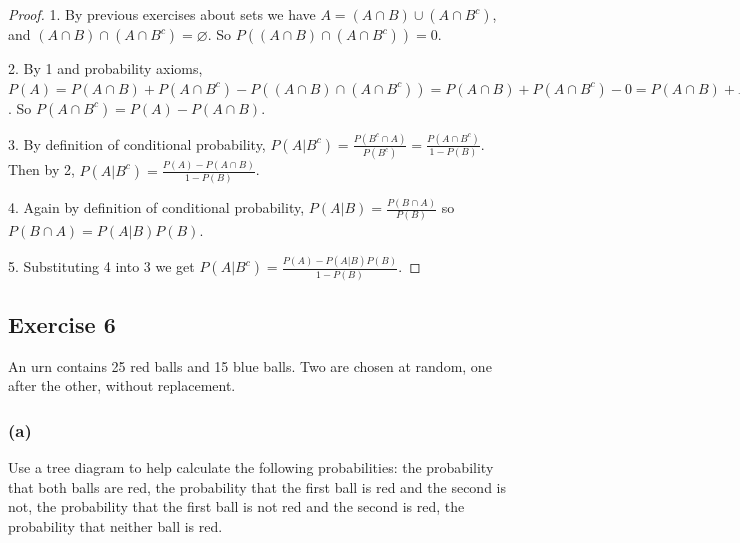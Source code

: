 \documentclass[14pt]{extarticle}
\newcommand{\es}{\varnothing}
\begin{document}
\begin{proof}
     1. By previous exercises about sets we have \(A = (A \cap B) \cup (A \cap B^c)\), and \((A \cap B) \cap (A \cap B^c) =
     \es\). So \(P((A \cap B) \cap (A \cap B^c)) = 0\).

     2. By 1 and probability axioms, \(P(A) = P(A \cap B) + P(A \cap B^c) - P((A \cap B) \cap (A \cap B^c)) = P(A \cap B) +
     P(A \cap B^c) - 0 = P(A \cap B) + P(A \cap B^c)\). So \(P(A \cap B^c) = P(A) - P(A \cap B)\).

     3. By definition of conditional probability, \(P(A | B^c) = \frac{P(B^c \cap A)}{P(B^c)} = \frac{P(A \cap B^c)}{1-P(B)}\).
     Then by 2, \(P(A | B^c) = \frac{P(A) - P(A \cap B)}{1-P(B)}\).

     4. Again by definition of conditional probability, \(P(A|B) = \frac{P(B \cap A)}{P(B)}\) so \(P(B \cap A) = P(A|B)P(B)\).

     5. Substituting 4 into 3 we get \(P(A | B^c) = \frac{P(A) - P(A|B)P(B)}{1-P(B)}\).
\end{proof}

\subsection{Exercise 6}
An urn contains 25 red balls and 15 blue balls. Two are chosen at random, one after the other, without replacement.

\subsubsection{(a)}
Use a tree diagram to help calculate the following probabilities: the probability that both balls are red, the
probability that the first ball is red and the second is not, the probability that the first ball is not red and the second
is red, the probability that neither ball is red.
\end{document}
